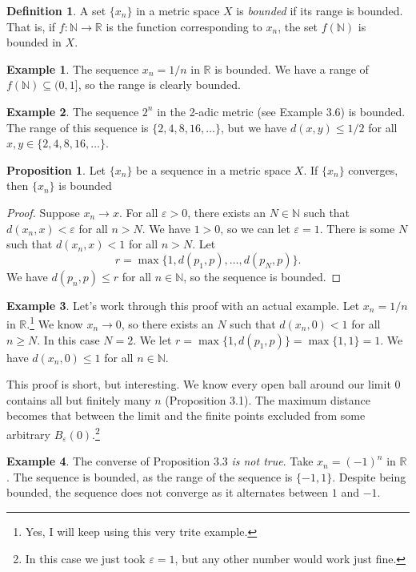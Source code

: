 \documentclass{article}
\newcommand{\N}{\mathbb{N}}
\newcommand{\R}{\mathbb{R}}
\theoremstyle{definition}
\newtheorem{proposition}{Proposition}[section]
\newtheorem{definition}{Definition}[section]
\newtheorem{example}{Example}[section]
\begin{document}
	\begin{definition}\label{def3.3}
		A set $ \{x_n\} $ in a metric space $ X $ is \textit{\color{red} bounded} if its range is bounded. That is, if $ f:\N\to\R $ is the function corresponding to $ x_n $, the set $ f(\N) $ is bounded in $ X $. 
	\end{definition}
	\begin{example}
		The sequence $ x_n=1/n$ in $ \R $ is bounded. We have a range of $ f(\N)\subseteq(0,1] $, so the range is clearly bounded.
	\end{example}
	\begin{example}
		The sequence $ 2^n $ in the 2-adic metric (see Example 3.6) is bounded. The range of this sequence is $ \{2,4,8,16,\ldots\} $, but we have $ d(x,y)\le1/2 $ for all $ x,y\in\{2,4,8,16,\ldots\} $. 
	\end{example}
	\begin{proposition}
		Let $ \{x_n\} $ be a sequence in a metric space $ X $. If $ \{x_n\} $ converges, then $ \{x_n\} $ is bounded
	\end{proposition}
	\begin{proof}
		Suppose $ x_n\to x $. For all $ \varepsilon>0 $, there exists an $ N\in\N $ such that $ d(x_n,x)<\varepsilon $ for all $ n>N $. We have $ 1>0 $, so we can let $ \varepsilon=1 $. There is some $ N $ such that $ d(x_n,x)<1 $ for all $ n>N $. Let $$r=\max\{1,d(p_1,p),\ldots,d(p_N,p)\} .$$ We have $ d(p_n,p)\le r $ for all $ n\in\N $, so the sequence is bounded.
	\end{proof}
	\begin{example}
		Let's work through this proof with an actual example. Let $ x_n=1/n $ in $ \R $.\footnote{Yes, I will keep using this very trite example.} We know $ x_n\to 0 $, so there exists an $ N $ such that $d(x_n,0)<1  $ for all $ n\ge N $. In this case $ N=2 $. We let $ r=\max\{1,d(p_1,p)\}=\max\{1,1\}=1 .$ We have $ d(x_n,0)\le 1 $ for all $ n\in\N $. 
		
		This proof is short, but interesting. We know every open ball around our limit $ 0 $ contains all but finitely many $ n $ (Proposition 3.1). The maximum distance becomes that between the limit and the finite points excluded from some arbitrary $ B_\varepsilon(0) $.\footnote{In this case we just took $ \varepsilon=1 $, but any other number would work just fine.}  	
	\end{example}
	\begin{example}
		The converse of Proposition 3.3 \textit{is not true}. Take $ x_n=(-1)^n $ in $ \R $. The sequence is bounded, as the range of the sequence is $ \{-1,1\} $. Despite being bounded, the sequence does not converge as it alternates between $ 1 $ and $ -1 $. 
	\end{example}
\end{document}
